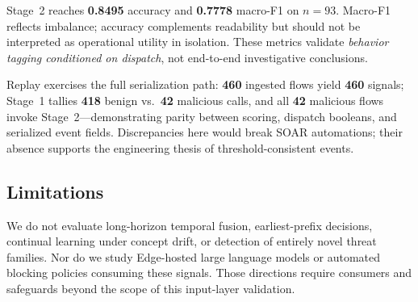 Stage~2 reaches \textbf{0.8495} accuracy and \textbf{0.7778} macro-F1 on $n=93$.
Macro-F1 reflects imbalance; accuracy complements readability but should not be interpreted as operational utility in isolation.
These metrics validate \emph{behavior tagging conditioned on dispatch}, not end-to-end investigative conclusions.

Replay exercises the full serialization path: \textbf{460} ingested flows yield \textbf{460} signals; Stage~1 tallies \textbf{418} benign vs.\ \textbf{42} malicious calls, and all \textbf{42} malicious flows invoke Stage~2---demonstrating parity between scoring, dispatch booleans, and serialized event fields.
Discrepancies here would break SOAR automations; their absence supports the engineering thesis of threshold-consistent events.

\subsection{Limitations}

We do not evaluate long-horizon temporal fusion, earliest-prefix decisions, continual learning under concept drift, or detection of entirely novel threat families.
Nor do we study Edge-hosted large language models or automated blocking policies consuming these signals.
Those directions require consumers and safeguards beyond the scope of this input-layer validation.



